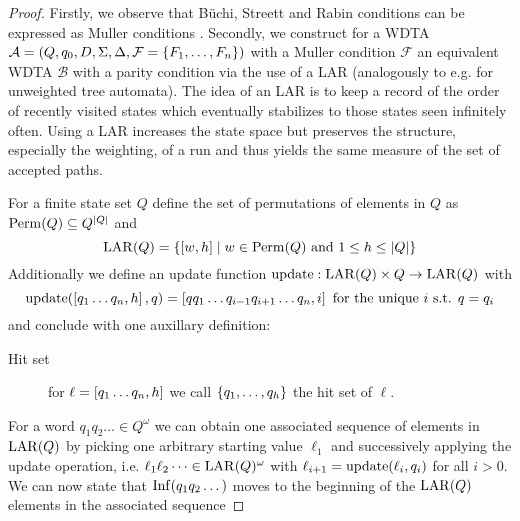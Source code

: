 \begin{proof}
  Firstly, we observe that Büchi, Streett and Rabin conditions can be expressed
  as Muller conditions \cite[Proposition 5.3]{LangAutoLog}. Secondly, we
  construct for a \ac{WDTA} $\mathcal{A} = \left(Q, q_{0}, D, \Sigma, \Delta,
  \mathcal{F} = \left\{F_{1},\dots,F_{n}\right\}\right)$ with a Muller condition $\mathcal{F}$
  an equivalent \ac{WDTA} $\mathcal{B}$ with a parity condition via the use of
  a \ac{LAR} (analogously to e.g. \cite{SimAltTreeAuto} for unweighted tree
  automata). The idea of an \ac{LAR} is to keep a record of the order of
  recently visited states which eventually stabilizes to those states seen
  infinitely often. Using a \ac{LAR} increases the state space but preserves
  the structure, especially the weighting, of a run and thus yields the same
  measure of the set of accepted paths. 
  \begin{definition}
    For a finite state set $Q$ define the set of permutations of elements in
    $Q$ as $\operatorname{Perm}(Q)\subseteq Q^{\left\vert{Q}\right\vert}$ and
    \begin{equation*}
      \operatorname{LAR}(Q) = \left\{\left[w,h\right]\mid w\in\operatorname{Perm}(Q)\text{ and }1\leq
      h\leq\left\vert{Q}\right\vert\right\}
    \end{equation*}
    Additionally we define an update function
    $\operatorname{update}:\operatorname{LAR}(Q)\times Q\rightarrow\operatorname{LAR}(Q)$ with
    \begin{equation*}
      \operatorname{update}(\left[q_{1}\dots q_{n},h\right], q)
      = \left[qq_{1}\dots q_{i-1}q_{i+1}\dots q_{n},i\right]
      \text{ for the unique }i\text{ s.t. }q=q_{i}
    \end{equation*}
    and conclude with one auxillary definition:
    \begin{description}
      \item [Hit set] for $\ell = \left[q_{1}\dots q_{n},h\right]$ we call
        $\left\{q_{1},\dots,q_{h}\right\}$ the hit set of $\ell$.
    \end{description}
  \end{definition}
  For a word $q_{1}q_{2}\dots\in Q^{\omega}$ we can obtain one associated
  sequence of elements in $\operatorname{LAR}(Q)$ by picking one arbitrary starting value
  $\ell_{1}$ and successively applying the update operation, i.e.
  $\ell_{1}\ell_{2}\dots\in\operatorname{LAR}(Q)^{\omega}$ with
  $\ell_{i+1} = \operatorname{update}(\ell_{i},q_{i})$ for all $i>0$. We can now state that
  $\operatorname{Inf}(q_{1}q_{2}\dots)$ moves to the beginning of the $\operatorname{LAR}(Q)$ elements in
  the associated sequence

\end{proof}
